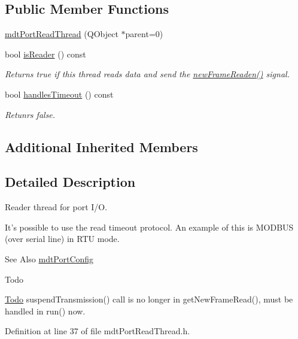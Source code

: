\subsection*{Public Member Functions}
\begin{DoxyCompactItemize}
\item 
\hyperlink{classmdt_port_read_thread_a180074c2ff60f5103d7e3aa27c1cdb01}{mdt\-Port\-Read\-Thread} (Q\-Object $\ast$parent=0)
\item 
bool \hyperlink{classmdt_port_read_thread_a0138d613b61056c9f8373331de2d9a84}{is\-Reader} () const 
\begin{DoxyCompactList}\small\item\em Returns true if this thread reads data and send the \hyperlink{classmdt_port_thread_a7fc2245c753fd65e1beffec211c41461}{new\-Frame\-Readen()} signal. \end{DoxyCompactList}\item 
bool \hyperlink{classmdt_port_read_thread_afa42f86f3fed878b8f44cacb3a2f41af}{handles\-Timeout} () const 
\begin{DoxyCompactList}\small\item\em Retunrs false. \end{DoxyCompactList}\end{DoxyCompactItemize}
\subsection*{Additional Inherited Members}


\subsection{Detailed Description}
Reader thread for port I/\-O. 

It's possible to use the read timeout protocol. An example of this is M\-O\-D\-B\-U\-S (over serial line) in R\-T\-U mode.

\begin{DoxySeeAlso}{See Also}
\hyperlink{classmdt_port_config}{mdt\-Port\-Config}
\end{DoxySeeAlso}
\begin{DoxyRefDesc}{Todo}
\item[\hyperlink{todo__todo000034}{Todo}]suspend\-Transmission() call is no longer in get\-New\-Frame\-Read(), must be handled in run() now. \end{DoxyRefDesc}


Definition at line 37 of file mdt\-Port\-Read\-Thread.\-h.



